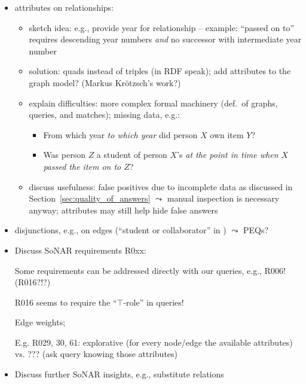 %
\begin{itemize}
  \item
    attributes on relationships:
    \begin{itemize}
      \item
        sketch idea: e.g., provide year for relationship  -- example: \enquote{passed on to} requires descending year numbers \emph{and} no successor with intermediate year number
      \item
        solution: quads instead of triples (in \gls{RDF} speak); add attributes to the graph model? (Markus Krötzsch's work?)
      \item
        explain difficulties: more complex formal machinery (def.\ of graphs, queries, and matches); missing data, e.g.:
        \begin{itemize}
          \item
            From which year \emph{to which year} did person $X$ own item $Y$?
          \item
            Was person $Z$ a student of person $X$'s \emph{at the point in time when $X$ passed the item on to $Z$}?
        \end{itemize}
      \item
        discuss usefulness: false positives due to incomplete data as discussed in Section~\ref{sec:quality_of_answers}
        $\leadsto$ manual inspection is necessary anyway; attributes may still help hide false answers
    \end{itemize}
  \item
    disjunctions, e.g., on edges (\enquote{student or collaborator} in ) $\leadsto$ PEQs?
  \item
    Discuss \gls{SoNAR} requirements R0xx:
    
    Some requirements can be addressed directly with our queries, e.g., R006! (R016?!?)

    R016 seems to require the \enquote{$\top$-role} in queries!

    Edge weights;

    E.g. R029, 30, 61: explorative (for every node/edge the available attributes) vs. ??? (ask query knowing those attributes)
    
  \item
    Discuss further SoNAR insights, e.g., substitute relations
    
\end{itemize}
